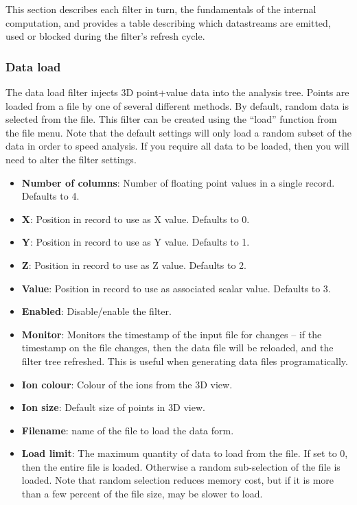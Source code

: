 \documentclass[10pt]{article}
\begin{document}
This section describes each filter in turn, the fundamentals of the internal computation, and provides a table describing which datastreams are emitted, used or blocked during the filter's refresh cycle.

\label{sec:filter} 
\subsubsection{Data load}
 
The data load filter injects 3D point+value data into the analysis tree. Points are loaded from a file by one of several different methods. By default, random data is selected from the file. This filter can be created using the ``load'' function from the file menu. Note that the default settings will only load a random subset of the data in order to speed analysis. If you require all data to be loaded, then you will need to alter the filter settings. 
\begin{itemize}
\item  \textbf{Number of columns}: Number of floating point values in a single record. Defaults to 4.
\item  \textbf{X}: Position in record to use as X value. Defaults to 0.
\item  \textbf{Y}: Position in record to use as Y value. Defaults to 1.
\item  \textbf{Z}: Position in record to use as Z value. Defaults to 2.
\item  \textbf{Value}: Position in record to use as associated scalar value. Defaults to 3.
\item \textbf{Enabled}: Disable/enable the filter.


\item \textbf{Monitor}: Monitors the timestamp of the input file for changes -- if the timestamp on the file changes, then the data file will be reloaded, and the filter tree refreshed. This is useful when generating data files programatically.
\item  \textbf{Ion colour}: Colour of the ions from the 3D view.
\item  \textbf{Ion size}: Default size of points in 3D view.
\item  \textbf{Filename}: name of the file to load the data form.
\item  \textbf{Load limit}: The maximum quantity of data to load from the file. If set to 0, then the entire file is loaded. Otherwise a random sub-selection of the file is loaded. Note that random selection reduces memory cost, but if it is more than a few percent of the file size, may be slower to load. 

\end{itemize}
\end{document}
